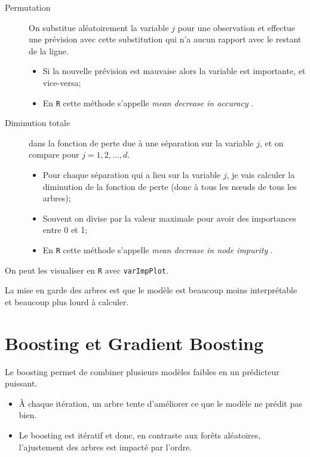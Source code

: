 \documentclass[10pt, french]{article}
\begin{document}
\begin{multicols*}{3}
\begin{description}
	\item[Permutation]	On substitue aléatoirement la variable $j$ pour une observation et effectue une prévision avec cette substitution qui n'a aucun rapport avec le restant de la ligne.
		\begin{itemize}[leftmargin = *]
		\item	Si la nouvelle prévision est mauvaise alors la variable est importante, et vice-versa;
		\item	En \texttt{R} cette méthode s'appelle \og \textit{mean decrease in accuracy} \fg{}.
		\end{itemize}
	\item[Diminution totale]	dans la fonction de perte due à une séparation sur la variable $j$, et on compare pour $j = 1, 2, \dots, d$.
		\begin{itemize}[leftmargin = *]
		\item	Pour chaque séparation qui a lieu sur la variable $j$, je vais calculer la diminution de la fonction de perte (donc à tous les nœuds de tous les arbres);
		\item	Souvent on divise par la valeur maximale pour avoir des importances entre 0 et 1;
		\item	En \texttt{R} cette méthode s'appelle \og \textit{mean decrease in node impurity} \fg{}.
		\end{itemize}
\end{description}
On peut les visualiser en \texttt{R} avec \texttt{varImpPlot}.

La mise en garde des arbres est que le modèle est beaucoup moins interprétable et beaucoup plus lourd à calculer.

\newpage

\section{Boosting et Gradient Boosting}
\begin{definitionNOHFILL}[Boosting]
Le boosting permet de combiner plusieurs modèles faibles en un prédicteur puissant.
\begin{itemize}[leftmargin = *]
	\item	À chaque itération, un arbre tente d'améliorer ce que le modèle ne prédit pas bien.
	\item	Le boosting est itératif et donc, en contraste aux forêts aléatoires, l'ajustement des arbres est impacté par l'ordre.
\end{itemize}
\end{definitionNOHFILL}


\end{multicols*}
\end{document}
